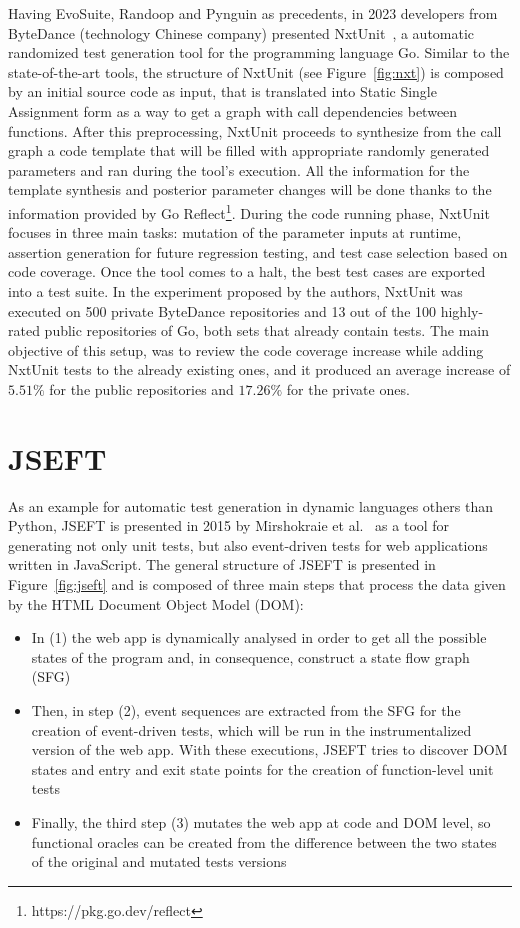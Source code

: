 \documentclass[%
  chapterprefix=false,%
  open=right,%
  twoside=true,%
  paper=a4,%
  logofile={Figures/logo.png},%
  thesistype=master,%
  UKenglish,%
]{se2thesis}
\begin{document}
Having EvoSuite, Randoop and Pynguin as precedents, in 2023 developers from ByteDance (technology Chinese company) presented NxtUnit~\cite{DBLP:conf/ease/WangMCGSP23}, a automatic randomized test generation tool for the programming language Go.
Similar to the state-of-the-art tools, the structure of NxtUnit (see Figure~\ref{fig:nxt}) is composed by an initial source code as input, that is translated into Static Single Assignment form as a way to get a graph with call dependencies between functions.
After this preprocessing, NxtUnit proceeds to synthesize from the call graph a code template that will be filled with appropriate randomly generated parameters and ran during the tool's execution.
All the information for the template synthesis and posterior parameter changes will be done thanks to the information provided by Go Reflect\footnote{https://pkg.go.dev/reflect}.
During the code running phase, NxtUnit focuses in three main tasks: mutation of the parameter inputs at runtime, assertion generation for future regression testing, and test case selection based on code coverage.
Once the tool comes to a halt, the best test cases are exported into a test suite.
In the experiment proposed by the authors, NxtUnit was executed on 500 private ByteDance repositories and 13 out of the 100 highly-rated public repositories of Go, both sets that already contain tests.
The main objective of this setup, was to review the code coverage increase while adding NxtUnit tests to the already existing ones, and it produced an average increase of \(5.51\%\) for the public repositories and \(17.26\%\) for the private ones.

\section{JSEFT}

As an example for automatic test generation in dynamic languages others than Python, JSEFT is presented in 2015 by Mirshokraie et al.~\cite{DBLP:conf/icst/Mirshokraie0P15} as a tool for generating not only unit tests, but also event-driven tests for web applications written in JavaScript.
The general structure of JSEFT is presented in Figure~\ref{fig:jseft} and is composed of three main steps that process the data given by the HTML Document Object Model (DOM):
\begin{itemize}
  \item In (1) the web app is dynamically analysed in order to get all the possible states of the program and, in consequence, construct a state flow graph (SFG)
  \item Then, in step (2), event sequences are extracted from the SFG for the creation of event-driven tests, which will be run in the instrumentalized version of the web app.
  With these executions, JSEFT tries to discover DOM states and entry and exit state points for the creation of function-level unit tests
  \item Finally, the third step (3) mutates the web app at code and DOM level, so functional oracles can be created from the difference between the two states of the original and mutated tests versions
\end{itemize}
\end{document}
